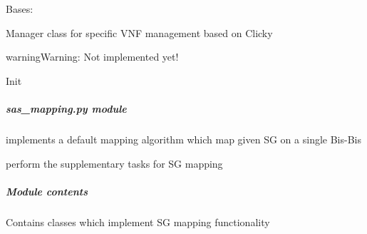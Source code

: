 \documentclass[letterpaper,10pt,english]{sphinxmanual}
\begin{document}
\begin{fulllineitems}
\label{service/element_mgmt:escape.service.element_mgmt.ClickManager}
Bases: {\hyperref[service/element_mgmt:escape.service.element_mgmt.AbstractElementManager]{\emph{}}}

Manager class for specific VNF management based on Clicky

\begin{notice}{warning}{Warning:}
Not implemented yet!
\end{notice}

\begin{fulllineitems}
\label{service/element_mgmt:escape.service.element_mgmt.ClickManager.__init__}
Init

\end{fulllineitems}


\end{fulllineitems}



\subparagraph{\emph{sas\_mapping.py} module}
\label{service/sas_mapping:sas-mapping-py-module}\label{service/sas_mapping::doc}
{\hyperref[service/sas_mapping:escape.service.sas_mapping.DefaultServiceMappingStrategy]{\emph{}}} implements a default mapping algorithm
which map given SG on a single Bis-Bis

{\hyperref[service/sas_mapping:escape.service.sas_mapping.ServiceGraphMapper]{\emph{}}} perform the supplementary tasks for SG mapping


\subparagraph{Module contents}
\label{service/sas_mapping:module-contents}\label{service/sas_mapping:module-escape.service.sas_mapping}
Contains classes which implement SG mapping functionality
\end{document}
